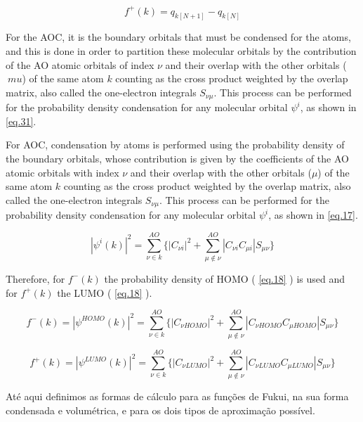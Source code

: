 \documentclass[a4paper,11pt]{refart}
\begin{document}
	\begin{equation}
	f^{+}(k) = q_{k [N+1]} - q_{k [N]}
	\label{eq.16}
	\end{equation}

	For the AOC, it is the boundary orbitals that must be condensed for the atoms, and this is done in order to partition these molecular orbitals by the contribution of the AO atomic orbitals of index $\nu$ and their overlap with the other orbitals ($\ mu$) of the same atom $k$ counting as the cross product weighted by the overlap matrix, also called the one-electron integrals $S_{\nu\mu}$. This process can be performed for the probability density condensation for any molecular orbital $\psi^i$, as shown in \autoref{eq.31}.

	For AOC, condensation by atoms is performed using the probability density of the boundary orbitals, whose contribution is given by the coefficients of the AO atomic orbitals with index $\nu$ and their overlap with the other orbitals ($\mu$) of the same atom $k$ counting as the cross product weighted by the overlap matrix, also called the one-electron integrals $S_{\nu\mu}$. This process can be performed for the probability density condensation for any molecular orbital $\psi^i$, as shown in \autoref{eq.17}.

	\begin{equation}
	|\psi^i(k)|^2  =\sum_{\nu \in k}^{AO} \Bigg \{ |C_{\nu i}|^{2} + \sum_{\mu \notin \nu }^{AO} |C_{\nu i} C_{\mu i}|S_{\mu \nu} \Bigg \}
	\label{eq.17}
	\end{equation}

	Therefore, for $f^-(k)$ the probability density of HOMO ( \autoref{eq.18} ) is used and for $f^+(k)$ the LUMO ( \autoref{eq.18} ).

	\begin{equation}
	f^-(k) =|\psi^{HOMO}(k)|^2 =  \sum_{\nu \in k}^{AO} \Bigg \{ |C_{\nu HOMO}|^{2} + \sum_{\mu \notin \nu }^{AO} |C_{\nu HOMO} C_{\mu HOMO}|S_{\mu \nu} \Bigg \}
	\label{eq.18}
	\end{equation}

	\begin{equation}
	f^+(k) = |\psi^{LUMO}(k)|^2 = \sum_{\nu \in k}^{AO} \Bigg \{ |C_{\nu LUMO}|^{2} + \sum_{\mu \notin \nu }^{AO} |C_{\nu LUMO} C_{\mu LUMO}|S_{\mu \nu} \Bigg \}
	\label{eq.19}
	\end{equation}

	Até aqui definimos as formas de cálculo para as funções de Fukui, na sua forma condensada e volumétrica, e para os dois tipos de aproximação possível. 
\end{document}
